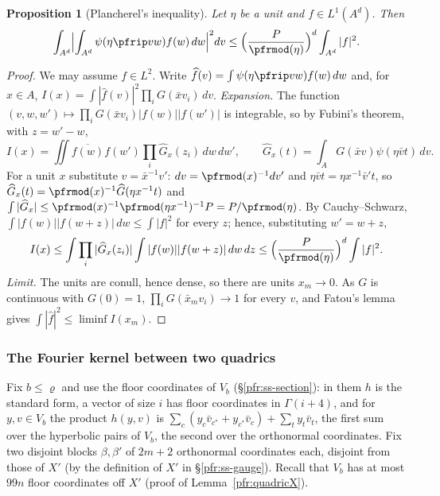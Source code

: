\documentclass[10pt]{amsart}
\newtheorem{proposition}[theorem]{Proposition}
\theoremstyle{definition}
\theoremstyle{remark}
\begin{document}
\begin{proposition}[Plancherel's inequality]\label{pfs:planch}
Let $\eta$ be a unit and $f\in L^1(A^d)$. Then
\[
\int_{A^d}\Bigl|\int_{A^d}\psi(\eta\pfrip vw)f(w)\,dw\Bigr|^2dv\le\Bigl(\frac P{\pfrmod(\eta)}\Bigr)^d\int_{A^d}|f|^2 .
\]
\end{proposition}
\begin{proof}
We may assume $f\in L^2$. Write $\widehat f(v)=\int\psi(\eta\pfrip vw)f(w)\,dw$ and, for $x\in A$,
$I(x)=\int|\widehat f(v)|^2\prod_iG(\bar xv_i)\,dv$. \emph{Expansion.} The function $(v,w,w')\mapsto\prod_iG(\bar x
v_i)|f(w)||f(w')|$ is integrable, so by Fubini's theorem, with $z=w'-w$,
\[
I(x)=\iint\overline{f(w)}f(w')\prod_i\widehat G_x(z_i)\,dw\,dw',\qquad\widehat G_x(t)=\int_AG(\bar xv)\psi(\eta\bar vt)\,dv .
\]
For a unit $x$ substitute $v=\bar x^{-1}v'$: $dv=\pfrmod(x)^{-1}dv'$ and $\eta\bar vt=\eta x^{-1}\bar v't$, so
$\widehat G_x(t)=\pfrmod(x)^{-1}\widehat G(\eta x^{-1}t)$ and $\int|\widehat G_x|\le\pfrmod(x)^{-1}\pfrmod(\eta
x^{-1})^{-1}P=P/\pfrmod(\eta)$. By Cauchy--Schwarz, $\int|f(w)||f(w+z)|\,dw\le\int|f|^2$ for every $z$; hence,
substituting $w'=w+z$,
\[
I(x)\le\int\prod_i|\widehat G_x(z_i)|\int|f(w)||f(w+z)|\,dw\,dz\le\Bigl(\frac P{\pfrmod(\eta)}\Bigr)^d\int|f|^2 .
\]
\emph{Limit.} The units are conull, hence dense, so there are units $x_m\to0$. As $G$ is continuous with
$G(0)=1$, $\prod_iG(\bar x_mv_i)\to1$ for every $v$, and Fatou's lemma gives $\int|\widehat f|^2\le\liminf
I(x_m)$.
\end{proof}

\subsubsection*{The Fourier kernel between two quadrics}
Fix $b\le\varrho$ and use the floor coordinates of $V_b$ (\S\ref{pfr:ss-section}): in them $h$ is the standard
form, a vector of size $i$ has floor coordinates in $\Gamma(i+4)$, and for $y,v\in V_b$ the product $h(y,v)$ is
$\sum_{c}(y_{c}\bar v_{c^*}+y_{c^*}\bar v_c)+\sum_{t}y_t\bar v_t$, the first sum over the hyperbolic pairs of $V_b$,
the second over the orthonormal coordinates. Fix two disjoint blocks $\beta,\beta'$ of $2m+2$ orthonormal
coordinates each, disjoint from those of $X'$ (by the definition of $X'$ in \S\ref{pfr:ss-gauge}). Recall that
$V_b$ has at most $99n$ floor coordinates off $X'$ (proof of Lemma~\ref{pfr:quadricX}).
\end{document}
